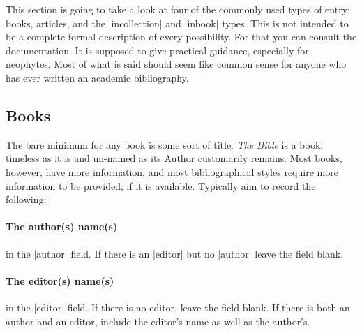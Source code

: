 {This section is going to take a look at four of the commonly used
types of entry: books, articles, and the |incollection| and
|inbook| types. This is not intended to be a complete formal
description of every possibility. For that you can consult the
documentation. It is supposed to give
practical guidance, especially for neophytes. Most of what is said
should seem like common sense for anyone who has ever written an
academic bibliography.

\subsection{Books}

The bare minimum for any book is some sort of title. \emph{The Bible}
is a book, timeless as it is and un-named as its Author customarily
remains. Most books, however, have more information, and most
bibliographical styles require more information to be provided, if it
is available. Typically aim to record the following:

\paragraph{The author(s) name(s)} in the |author| field. If there is
an |editor| but no |author| leave the field blank.

\paragraph{The editor(s) name(s)} in the |editor| field. If there is
no editor, leave the field blank. If there is both an author and an
editor, include the editor's name as well as the author's.

}
